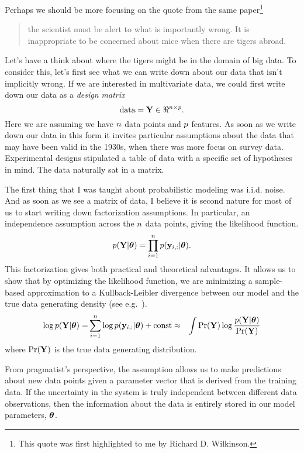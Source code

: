 \documentclass[a4paperpaper,]{article}
\begin{document}
Perhaps we should be more focusing on the quote from the same
paper\footnote{This quote was first highlighted to me by Richard D.
  Wilkinson.}

\begin{quote}
the scientist must be alert to what is importantly wrong. It is
inappropriate to be concerned about mice when there are tigers abroad.

\citet{Box:science76}
\end{quote}

Let's have a think about where the tigers might be in the domain of big
data. To consider this, let's first see what we can write down about our
data that isn't implicitly wrong. If we are interested in multivariate
data, we could first write down our data as a \emph{design matrix} \[
\text{data} = \mathbf{\mathbf{Y}} \in \Re^{n\times p}.
\] Here we are assuming we have \(n\) data points and
\(p\) features. As soon as we write down our data in this form it
invites particular assumptions about the data that may have been valid
in the 1930s, when there was more focus on survey data. Experimental
designs stipulated a table of data with a specific set of hypotheses in
mind. The data naturally sat in a matrix.

The first thing that I was taught about probabilistic modeling was
i.i.d. noise. And as soon as we see a matrix of data, I believe it is
second nature for most of us to start writing down factorization
assumptions. In particular, an independence assumption across the
\(n\) data points, giving the likelihood function. \begin{align*}
p(\mathbf{Y}|\boldsymbol{ \theta}) = \prod_{i=1}^n p(\mathbf{ y}_{i, :} | \boldsymbol{\theta}).
\end{align*} This factorization gives both practical and theoretical
advantages. It allows us to show that by optimizing the likelihood
function, we are minimizing a sample-based approximation to a
Kullback-Leibler divergence between our model and the true data
generating density (see e.g.~\citet{Wasserman:all03}). \begin{align*}
\log p(\mathbf{Y}|\boldsymbol{ \theta}) =& \sum_{i=1}^n \log p(\mathbf{ y}_{i, :} | \boldsymbol{\theta}) + \text{const}
\approx & \int \Pr(\mathbf{Y}) \log \frac{p(\mathbf{Y}|\boldsymbol{ \theta})}{\Pr(\mathbf{Y})}
\end{align*} where \(\Pr(\mathbf{Y})\) is the true data generating
distribution.

From pragmatist's perspective, the assumption allows us to make
predictions about new data points given a parameter vector that is
derived from the training data. If the uncertainty in the system is
truly independent between different data observations, then the
information about the data is entirely stored in our model parameters,
\(\boldsymbol{ \theta}\).
\end{document}
